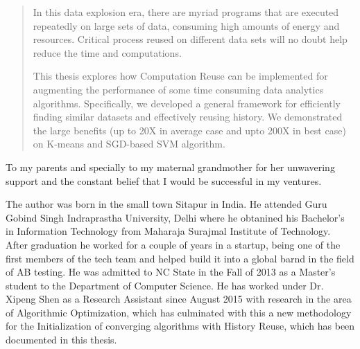 \begin{abstract}

In this data explosion era, there are myriad programs that are executed repeatedly on large sets of data, consuming high amounts of energy and resources. Critical process reused on different data sets will no doubt help reduce the time and computations.

This thesis explores how Computation Reuse can be implemented for augmenting the performance of some time consuming data analytics algorithms. Specifically, we developed a general framework for efficiently finding similar datasets and effectively reusing history. We demonstrated the large benefits (up to 20X in average case and upto 200X in best case) on K-means and SGD-based SVM algorithm. 




\end{abstract}


\makecopyrightpage

\maketitlepage

\begin{dedication}
 \centering To my parents and specially to my maternal grandmother for her unwavering support and the constant belief that I would be successful in my ventures.
\end{dedication}

\begin{biography}
The author was born in the small town Sitapur in India. He attended Guru Gobind Singh Indraprastha University, Delhi where he obtanined his  Bachelor’s in Information Technology from Maharaja Surajmal Institute of Technology. After graduation he worked for a couple of years in a startup, being one of the first members of the tech team and helped build it into a global barnd in the field of AB testing. He was admitted to NC State in the Fall of 2013 as a Master’s student to the Department of Computer Science. He has worked under Dr. Xipeng Shen as a Research Assistant since August 2015 with research in the area of Algorithmic Optimization, which has culminated with this a new methodology for the Initialization of converging algorithms with History Reuse, which has been documented in this thesis.
\end{biography}

